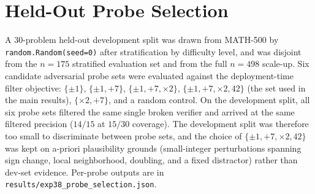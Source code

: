 \documentclass[11pt]{article}
\begin{document}



\appendix

\section{Held-Out Probe Selection}

A 30-problem held-out development split was drawn from MATH-500 by \texttt{random.Random(seed=0)} after stratification by difficulty level, and was disjoint from the $n{=}175$ stratified evaluation set and from the full $n{=}498$ scale-up. Six candidate adversarial probe sets were evaluated against the deployment-time filter objective: $\{\pm 1\}$, $\{\pm 1, +7\}$, $\{\pm 1, +7, \times 2\}$, $\{\pm 1, +7, \times 2, 42\}$ (the set used in the main results), $\{\times 2, +7\}$, and a random control. On the development split, all six probe sets filtered the same single broken verifier and arrived at the same filtered precision ($14/15$ at $15/30$ coverage). The development split was therefore too small to discriminate between probe sets, and the choice of $\{\pm 1, +7, \times 2, 42\}$ was kept on a-priori plausibility grounds (small-integer perturbations spanning sign change, local neighborhood, doubling, and a fixed distractor) rather than dev-set evidence. Per-probe outputs are in \texttt{results/exp38\_probe\_selection.json}.
\end{document}
